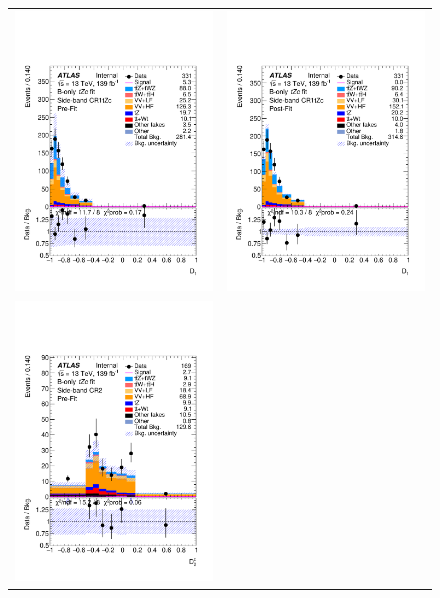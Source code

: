 \begin{figure}[htbp]
	\centering
	\begin{tabular}{cc}
		\includegraphics[width=.45\textwidth]{Appendices/AP9/figures/BONLY_CRSR_DL1rc_unblind/Plots/SBCR1} &
		\includegraphics[width=.45\textwidth]{Appendices/AP9/figures/BONLY_CRSR_DL1rc_unblind/Plots/SBCR1_postFit} \\
		\includegraphics[width=.45\textwidth]{Appendices/AP9/figures/BONLY_CRSR_DL1rc_unblind/Plots/SBCR2} &

\end{tabular}
\end{figure}
